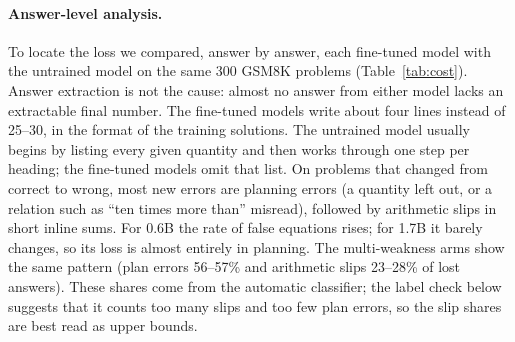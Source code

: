 \documentclass[11pt]{article}
\begin{document}
\paragraph{Answer-level analysis.} To locate the loss we compared, answer by answer, each fine-tuned model with the untrained model on the same 300 GSM8K
problems (Table~\ref{tab:cost}). Answer extraction is not the cause: almost no answer from either model lacks an
extractable final number. The fine-tuned models write about four lines instead of 25--30, in the format of the training
solutions. The untrained model usually begins by listing every given quantity and then works through one step per
heading; the fine-tuned models omit that list. On problems that changed from correct to wrong, most new errors are
planning errors (a quantity left out, or a relation such as ``ten times more than'' misread), followed by arithmetic
slips in short inline sums. For 0.6B the rate of false equations rises; for 1.7B it barely changes, so its loss is
almost entirely in planning. The multi-weakness arms show the same pattern (plan errors 56--57\% and arithmetic slips
23--28\% of lost answers). These shares come from the automatic classifier; the label check below suggests that it
counts too many slips and too few plan errors, so the slip shares are best read as upper bounds.
\end{document}
